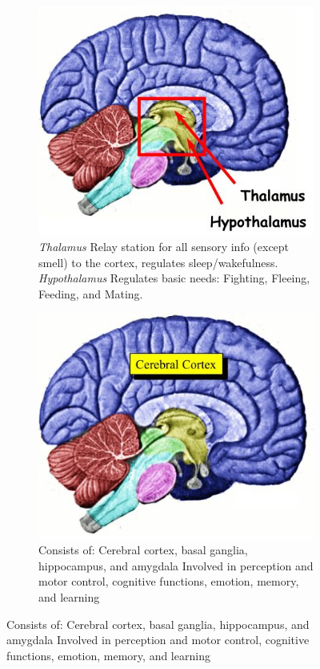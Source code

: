 \documentclass[]{article}
\begin{document}
\begin{figure}[H]
\begin{subfigure}[b]{0.45\textwidth}
	\end{subfigure}
	\begin{subfigure}[b]{0.45\textwidth}
		\caption{\emph{Thalamus} Relay station for all 	sensory info (except 	smell) to the cortex, regulates sleep/wakefulness.
		\emph{Hypothalamus} Regulates basic needs: 	Fighting, Fleeing, 	Feeding, and Mating.}
		\includegraphics[width=\textwidth]{thalamus}
	\end{subfigure}
	\begin{subfigure}[b]{0.45\textwidth}
		\caption{ Consists of: Cerebral cortex, basal ganglia, 	hippocampus, and amygdala
		Involved in perception 	and motor control, 	cognitive functions,	emotion, memory, and learning}
		\includegraphics[width=\textwidth]{Cerebrum}
	\end{subfigure}
\end{figure}
\end{document}
